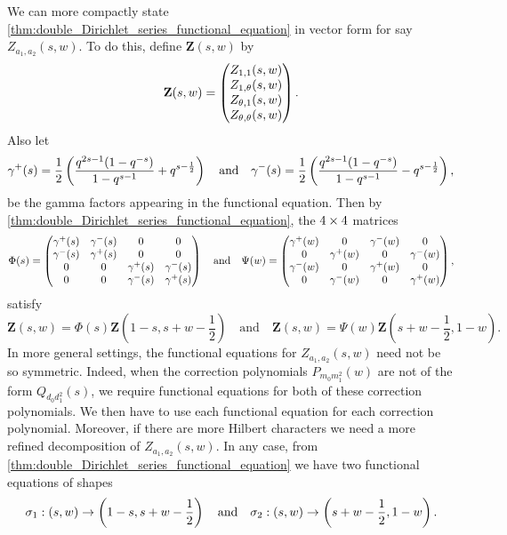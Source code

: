 \documentclass[12pt,reqno,oneside]{amsart}
\begin{document}
    We can more compactly state \cref{thm:double_Dirichlet_series_functional_equation} in vector form for say $Z_{a_{1},a_{2}}(s,w)$. To do this, define $\mathbf{Z}(s,w)$ by
    \[
        \mathbf{Z}(s,w) = \begin{pmatrix} Z_{1,1}(s,w) \\ Z_{1,\theta}(s,w) \\ Z_{\theta,1}(s,w) \\ Z_{\theta,\theta}(s,w) \end{pmatrix}.
    \]
    Also let
    \[
        \gamma^{+}(s) = \frac{1}{2}\left(\frac{q^{2s-1}(1-q^{-s})}{1-q^{s-1}}+q^{s-\frac{1}{2}}\right) \quad \text{and} \quad \gamma^{-}(s) = \frac{1}{2}\left(\frac{q^{2s-1}(1-q^{-s})}{1-q^{s-1}}-q^{s-\frac{1}{2}}\right),
    \]
    be the gamma factors appearing in the functional equation. Then by \cref{thm:double_Dirichlet_series_functional_equation}, the $4 \times 4$ matrices
    \[
        \Phi(s) = \begin{pmatrix} \gamma^{+}(s) & \gamma^{-}(s) & 0 & 0 \\ \gamma^{-}(s) & \gamma^{+}(s) & 0 & 0 \\ 0 & 0 & \gamma^{+}(s) & \gamma^{-}(s) \\ 0 & 0 & \gamma^{-}(s) & \gamma^{+}(s) \\ \end{pmatrix} \quad \text{and} \quad \Psi(w) = \begin{pmatrix} \gamma^{+}(w) & 0 & \gamma^{-}(w) & 0 \\ 0 & \gamma^{+}(w) & 0 & \gamma^{-}(w) \\ \gamma^{-}(w) & 0 & \gamma^{+}(w) & 0 \\ 0 & \gamma^{-}(w) & 0 & \gamma^{+}(w) \\ \end{pmatrix},
    \]
    satisfy
    \[
        \mathbf{Z}(s,w) = \Phi(s)\mathbf{Z}\left(1-s,s+w-\frac{1}{2}\right) \quad \text{and} \quad \mathbf{Z}(s,w) = \Psi(w)\mathbf{Z}\left(s+w-\frac{1}{2},1-w\right).
    \]
    In more general settings, the functional equations for $Z_{a_{1},a_{2}}(s,w)$ need not be so symmetric. Indeed, when the correction polynomials $P_{m_{0}m_{1}^{2}}(w)$ are not of the form $Q_{d_{0}d_{1}^{2}}(s)$, we require functional equations for both of these correction polynomials. We then have to use each functional equation for each correction polynomial. Moreover, if there are more Hilbert characters we need a more refined decomposition of $Z_{a_{1},a_{2}}(s,w)$. In any case, from \cref{thm:double_Dirichlet_series_functional_equation} we have two functional equations of shapes
    \[
        \sigma_{1}:(s,w) \to \left(1-s,s+w-\frac{1}{2}\right) \quad \text{and} \quad \sigma_{2}:(s,w) \to \left(s+w-\frac{1}{2},1-w\right).
    \]
\end{document}
